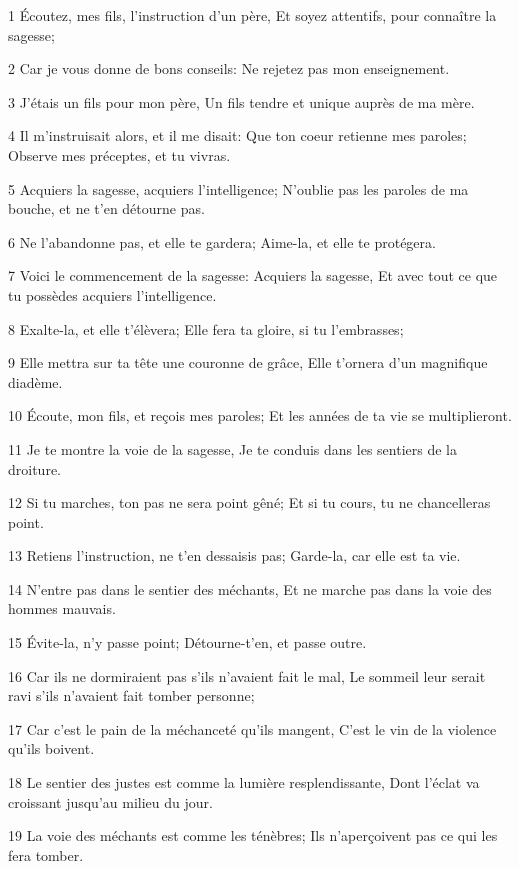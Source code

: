 \par 1 Écoutez, mes fils, l'instruction d'un père, Et soyez attentifs, pour connaître la sagesse;
\par 2 Car je vous donne de bons conseils: Ne rejetez pas mon enseignement.
\par 3 J'étais un fils pour mon père, Un fils tendre et unique auprès de ma mère.
\par 4 Il m'instruisait alors, et il me disait: Que ton coeur retienne mes paroles; Observe mes préceptes, et tu vivras.
\par 5 Acquiers la sagesse, acquiers l'intelligence; N'oublie pas les paroles de ma bouche, et ne t'en détourne pas.
\par 6 Ne l'abandonne pas, et elle te gardera; Aime-la, et elle te protégera.
\par 7 Voici le commencement de la sagesse: Acquiers la sagesse, Et avec tout ce que tu possèdes acquiers l'intelligence.
\par 8 Exalte-la, et elle t'élèvera; Elle fera ta gloire, si tu l'embrasses;
\par 9 Elle mettra sur ta tête une couronne de grâce, Elle t'ornera d'un magnifique diadème.
\par 10 Écoute, mon fils, et reçois mes paroles; Et les années de ta vie se multiplieront.
\par 11 Je te montre la voie de la sagesse, Je te conduis dans les sentiers de la droiture.
\par 12 Si tu marches, ton pas ne sera point gêné; Et si tu cours, tu ne chancelleras point.
\par 13 Retiens l'instruction, ne t'en dessaisis pas; Garde-la, car elle est ta vie.
\par 14 N'entre pas dans le sentier des méchants, Et ne marche pas dans la voie des hommes mauvais.
\par 15 Évite-la, n'y passe point; Détourne-t'en, et passe outre.
\par 16 Car ils ne dormiraient pas s'ils n'avaient fait le mal, Le sommeil leur serait ravi s'ils n'avaient fait tomber personne;
\par 17 Car c'est le pain de la méchanceté qu'ils mangent, C'est le vin de la violence qu'ils boivent.
\par 18 Le sentier des justes est comme la lumière resplendissante, Dont l'éclat va croissant jusqu'au milieu du jour.
\par 19 La voie des méchants est comme les ténèbres; Ils n'aperçoivent pas ce qui les fera tomber.

